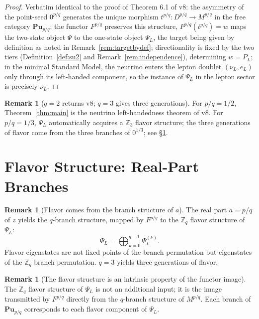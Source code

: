 \documentclass[11pt]{article}
\theoremstyle{plain}
\theoremstyle{definition}
\newtheorem{rem}[thm]{Remark}
\newcommand{\Cat}{\mathbf}
\begin{document}
\begin{proof}
Verbatim identical to the proof of Theorem 6.1 of v8:
the asymmetry of the point-seed $0^{p/q}$ generates the unique morphism
$t^{p/q}: D^{p/q}\to M^{p/q}$ in the free category $\Cat{Pu}_{p/q}$;
the functor $F^{p/q}$ preserves this structure, $F^{p/q}(t^{p/q}) = w$ maps
the two-state object $\Psi$ to the one-state object $\Psi_L$, the target
being given by definition as noted in Remark~\ref{rem:targetbydef};
directionality is fixed by the two tiers (Definition~\ref{def:su2} and
Remark~\ref{rem:independence}), determining $w = P_L$;
in the minimal Standard Model, the neutrino enters the lepton doublet
$(\nu_L,e_L)$ only through its left-handed component, so the instance of
$\Psi_L$ in the lepton sector is precisely $\nu_L$.
\end{proof}

\begin{rem}[$q=2$ returns v8; $q=3$ gives three generations]\label{rem:qcases}
For $p/q = 1/2$, Theorem~\ref{thm:main} is the neutrino left-handedness
theorem of v8. For $p/q = 1/3$, $\Psi_L$ automatically acquires a
$\mathbb{Z}_3$ flavor structure; the three generations of flavor come from
the three branches of $0^{1/3}$; see \S\ref{sec:flavor}.
\end{rem}

\section{Flavor Structure: Real-Part Branches}\label{sec:flavor}

\begin{rem}[Flavor comes from the branch structure of $a$]\label{rem:flavor}
The real part $a = p/q$ of $z$ yields the $q$-branch structure, mapped by
$F^{p/q}$ to the $\mathbb{Z}_q$ flavor structure of $\Psi_L$:
\[
\Psi_L = \bigoplus_{k=0}^{q-1} \Psi_L^{(k)}.
\]
Flavor eigenstates are not fixed points of the branch permutation but
eigenstates of the $\mathbb{Z}_q$ branch permutation. $q=3$ yields three
generations of flavor.
\end{rem}

\begin{rem}[The flavor structure is an intrinsic property of the functor image]\label{rem:flavorfrom}
The $\mathbb{Z}_q$ flavor structure of $\Psi_L$ is not an additional input;
it is the image transmitted by $F^{p/q}$ directly from the $q$-branch
structure of $M^{p/q}$. Each branch of $\Cat{Pu}_{p/q}$ corresponds to each
flavor component of $\Psi_L$.
\end{rem}
\end{document}
